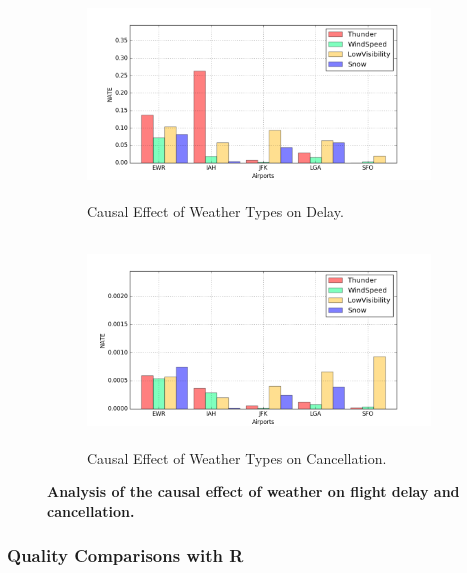 \begin{figure}
\hspace*{-0.7cm} \begin{subfigure}{0.62\linewidth}
\centering
\includegraphics[height=5.5cm,width=\linewidth]{Figures/ATT(delay).png}
\caption{{Causal Effect of Weather Types on  Delay.}}
\label{sfig:testc}
\end{subfigure}\hfill
\hspace*{-0.7cm}\begin{subfigure}{0.62\linewidth}
\centering
\includegraphics[height=5.5cm,width=\linewidth]{Figures/cancel.png}
\caption{{Causal Effect of Weather Types  on  Cancellation.}}
\label{sfig:testd}
\end{subfigure}\hfill

\caption{ \bf{Analysis of the causal effect of weather on flight delay and cancellation.}}
\label{fig:eteresult}
\end{figure}




\vspace{-.3cm}
\subsubsection{Quality Comparisons with R}



